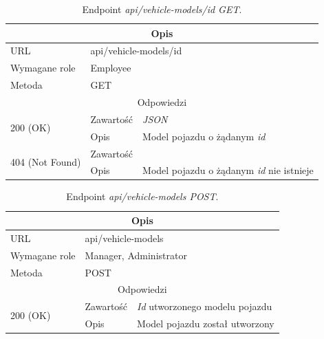 \documentclass[eng,printmode,openany]{mgr}
\begin{document}
	\begin{table}[H]
		\caption{Endpoint \textit{api/vehicle-models/id GET}.}
		\begin{tabularx}{\textwidth}{|l|l|X|}
			\hline
			\multicolumn{3}{|c|}{Opis}
			\\ \hline
			URL                         & \multicolumn{2}{l|}{api/vehicle-models/id}
			\\ \hline
			Wymagane role               & \multicolumn{2}{l|}{Employee}
			\\ \hline
			Metoda                      & \multicolumn{2}{l|}{GET}
			\\ \hline
			\multicolumn{3}{|c|}{Odpowiedzi}
			\\ \hline
			\multirow{2}{*}{200 (OK)} 	        & Zawartość   	& \textit{JSON}
			\\ \cline{2-3}                      & Opis         	& Model pojazdu o żądanym \textit{id}
			\\ \hline
			\multirow{2}{*}{404 (Not Found)} 	& Zawartość     & 
			\\ \cline{2-3}                      & Opis          & Model pojazdu o żądanym \textit{id} nie istnieje
			\\ \hline
		\end{tabularx}
	\end{table}
	
	\begin{table}[H]
		\caption{Endpoint \textit{api/vehicle-models POST}.}
		\begin{tabularx}{\textwidth}{|l|l|X|}
			\hline
			\multicolumn{3}{|c|}{Opis}
			\\ \hline
			URL                       & \multicolumn{2}{l|}{api/vehicle-models}
			\\ \hline
			Wymagane role             & \multicolumn{2}{l|}{Manager, Administrator}
			\\ \hline
			Metoda                    & \multicolumn{2}{l|}{POST}
			\\ \hline
			\multicolumn{3}{|c|}{Odpowiedzi}
			\\ \hline
			\multirow{2}{*}{200 (OK)} 		& Zawartość     & \textit{Id} utworzonego modelu pojazdu
			\\ \cline{2-3}                  & Opis         	& Model pojazdu został utworzony
			\\ \hline
		\end{tabularx}
	\end{table}
	
\end{document}

